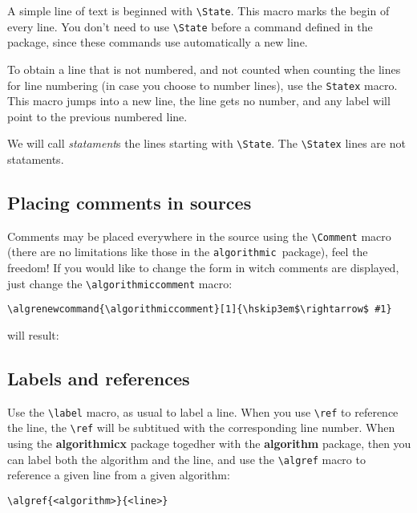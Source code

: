 \documentclass{jsarticle}
\newcommand{\old}{\texttt{algorithmic}}
\begin{document}
A simple line of text is beginned with \verb:\State:. This macro marks the begin of every 
line. You don't need to use \verb:\State: before a command defined in the package, since 
these commands use automatically a new line.

To obtain a line that is not numbered, and not counted when counting the lines for line numbering
(in case you choose to number lines), use the \verb:Statex: macro. This macro jumps into a new line, 
the line gets no number, and any label will point to the previous numbered line.

We will call \textit{statament\/}s the lines starting with \verb:\State:. The \verb:\Statex: 
lines are not stataments.



\subsection{Placing comments in sources}\label{Putting comments in sources}

Comments may be placed everywhere in the source using the \verb:\Comment: macro 
(there are no limitations like those in the \old\ package), feel the freedom!
If you would like to change the form in witch comments are displayed, just 
change the \verb:\algorithmiccomment: macro:

\begin{verbatim}
\algrenewcommand{\algorithmiccomment}[1]{\hskip3em$\rightarrow$ #1}
\end{verbatim}

will result:
\medskip
{}



\subsection{Labels and references}
Use the \verb:\label: macro, as usual to label a line. When you use \verb:\ref: to reference 
the line, the \verb:\ref: will be subtitued with the corresponding line number. When using the 
\textbf{algorithmicx} package togedher with the \textbf{algorithm} package, then you can label 
both the algorithm and the line, and use the \verb:\algref: macro to reference a given line 
from a given algorithm:

\begin{verbatim}
\algref{<algorithm>}{<line>}
\end{verbatim}
\end{document}
